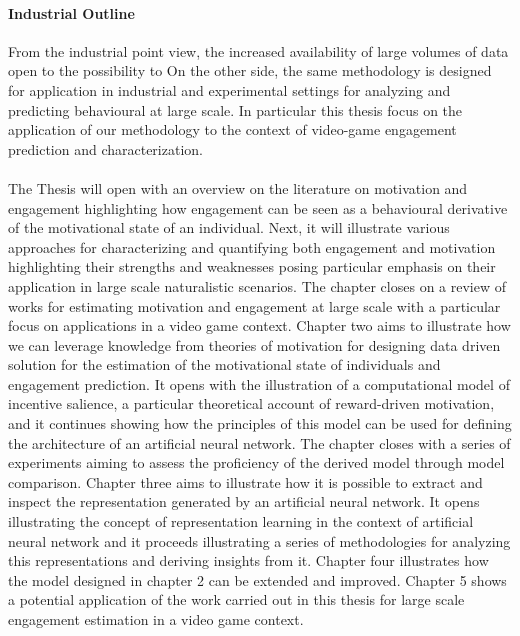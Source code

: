 \paragraph*{Industrial Outline}
From the industrial point view, the increased availability of large volumes of data open to the possibility to On the other side, the same methodology is designed for application in industrial and experimental settings for analyzing and predicting behavioural at large scale. In particular this thesis focus on the application of our methodology to the context of video-game engagement prediction and characterization.
\\
\\
The Thesis will open with an overview on the literature on motivation and engagement highlighting how engagement can be seen as a behavioural derivative of the motivational state of an individual. Next, it will illustrate various approaches for characterizing and quantifying both engagement and motivation highlighting their strengths and weaknesses posing particular emphasis on their application in large scale naturalistic scenarios. The chapter closes on a review of works for estimating motivation and engagement at large scale with a particular focus on applications in a video game context. Chapter two aims to illustrate how we can leverage knowledge from theories of motivation for designing data driven solution for the estimation of the motivational state of individuals and engagement prediction. It opens with the illustration of a computational model of incentive salience, a particular theoretical account of reward-driven motivation, and it continues showing how the principles of this model can be used for defining the architecture of an artificial neural network. The chapter closes with a series of experiments aiming to assess the proficiency of the derived model through model comparison. Chapter three aims to illustrate how it is possible to extract and inspect the representation generated by an artificial neural network. It opens illustrating the concept of representation learning in the context of artificial neural network and it proceeds illustrating a series of methodologies for analyzing this representations and deriving insights from it. Chapter four illustrates how the model designed in chapter 2 can be extended and improved. Chapter 5 shows a potential application of the work carried out in this thesis for large scale engagement estimation in a video game context.


